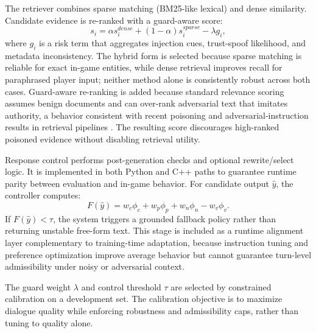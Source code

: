 ﻿\documentclass[a4paper,12pt]{article}
\begin{document}
The retriever combines sparse matching (BM25-like lexical) and dense similarity. Candidate evidence is re-ranked with a guard-aware score:
\begin{equation}
s_i = \alpha s_i^{dense} + (1-\alpha)s_i^{sparse} - \lambda g_i,
\end{equation}
where \(g_i\) is a risk term that aggregates injection cues, trust-spoof likelihood, and metadata inconsistency. The hybrid form is selected because sparse matching is reliable for exact in-game entities, while dense retrieval improves recall for paraphrased player input; neither method alone is consistently robust across both cases. Guard-aware re-ranking is added because standard relevance scoring assumes benign documents and can over-rank adversarial text that imitates authority, a behavior consistent with recent poisoning and adversarial-instruction results in retrieval pipelines \cite{Zou2025PoisonedRAG,Chaturvedi2025AIP}. The resulting score discourages high-ranked poisoned evidence without disabling retrieval utility.

Response control performs post-generation checks and optional rewrite/select logic. It is implemented in both Python and C++ paths to guarantee runtime parity between evaluation and in-game behavior. For candidate output \(\hat{y}\), the controller computes:
\begin{equation}
F(\hat{y}) = w_c\phi_c + w_p\phi_p + w_n\phi_n - w_v\phi_v.
\end{equation}
If \(F(\hat{y}) < \tau\), the system triggers a grounded fallback policy rather than returning unstable free-form text. This stage is included as a runtime alignment layer complementary to training-time adaptation, because instruction tuning and preference optimization improve average behavior but cannot guarantee turn-level admissibility under noisy or adversarial context.

The guard weight \(\lambda\) and control threshold \(\tau\) are selected by constrained calibration on a development set. The calibration objective is to maximize dialogue quality while enforcing robustness and admissibility caps, rather than tuning to quality alone.
\end{document}
